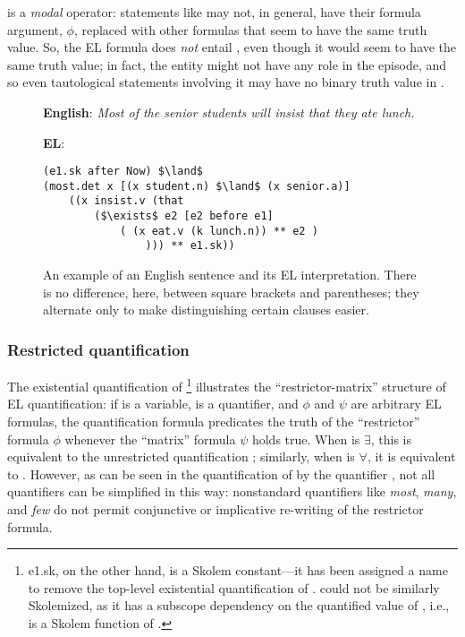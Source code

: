 \el{**} is a \textit{modal} operator: statements like \el{[$\phi$ ** e]} may not, in general, have their formula argument, $\phi$, replaced with other formulas that seem to have the same truth value. So, the EL formula  does \textit{not} entail , even though it would seem to have the same truth value; in fact, the entity  might not have any role in the episode, and so even tautological statements involving it may have no binary truth value in .

\begin{figure}

\textbf{English}: \textit{Most of the senior students will insist that they ate lunch.}

\textbf{EL}: \begin{lstlisting}[xleftmargin=4.5em,style=EL,mathescape=true]
(e1.sk after Now) $\land$
(most.det x [(x student.n) $\land$ (x senior.a)]
    ((x insist.v (that 
        ($\exists$ e2 [e2 before e1]
            ( (x eat.v (k lunch.n)) ** e2 )
                ))) ** e1.sk))
\end{lstlisting}
    \caption{An example of an English sentence and its EL interpretation. There is no difference, here, between square brackets and parentheses; they alternate only to make distinguishing certain clauses easier.}
    \label{fig:eng_el_pair}
\end{figure}

\subsubsection{Restricted quantification}
The existential quantification of \footnote{e1.sk, on the other hand, is a Skolem constant---it has been assigned a name to remove the top-level existential quantification of .  could not be similarly Skolemized, as it has a subscope dependency on the quantified value of , i.e.,  is a Skolem function of .} illustrates the ``restrictor-matrix'' structure of EL quantification: if  is a variable,  is a quantifier, and $\phi$ and $\psi$ are arbitrary EL formulas, the quantification formula  predicates the truth of the ``restrictor'' formula $\phi$ whenever the ``matrix'' formula $\psi$ holds true. When  is $\exists$, this is equivalent to the unrestricted quantification ; similarly, when  is $\forall$, it is equivalent to . However, as can be seen in the quantification of  by the quantifier , not all quantifiers can be simplified in this way: nonstandard quantifiers like \textit{most}, \textit{many}, and \textit{few} do not permit conjunctive or implicative re-writing of the restrictor formula.

